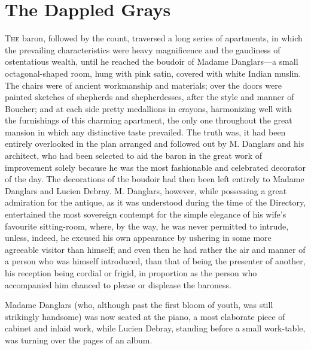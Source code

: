 \chapter{The Dappled Grays} 

 \lettrine{T}{he} baron, followed by the count, traversed a long series of apartments, in which the prevailing characteristics were heavy magnificence and the gaudiness of ostentatious wealth, until he reached the boudoir of Madame Danglars—a small octagonal-shaped room, hung with pink satin, covered with white Indian muslin. The chairs were of ancient workmanship and materials; over the doors were painted sketches of shepherds and shepherdesses, after the style and manner of Boucher; and at each side pretty medallions in crayons, harmonizing well with the furnishings of this charming apartment, the only one throughout the great mansion in which any distinctive taste prevailed. The truth was, it had been entirely overlooked in the plan arranged and followed out by M. Danglars and his architect, who had been selected to aid the baron in the great work of improvement solely because he was the most fashionable and celebrated decorator of the day. The decorations of the boudoir had then been left entirely to Madame Danglars and Lucien Debray. M. Danglars, however, while possessing a great admiration for the antique, as it was understood during the time of the Directory, entertained the most sovereign contempt for the simple elegance of his wife's favourite sitting-room, where, by the way, he was never permitted to intrude, unless, indeed, he excused his own appearance by ushering in some more agreeable visitor than himself; and even then he had rather the air and manner of a person who was himself introduced, than that of being the presenter of another, his reception being cordial or frigid, in proportion as the person who accompanied him chanced to please or displease the baroness. 

 Madame Danglars (who, although past the first bloom of youth, was still strikingly handsome) was now seated at the piano, a most elaborate piece of cabinet and inlaid work, while Lucien Debray, standing before a small work-table, was turning over the pages of an album. 

